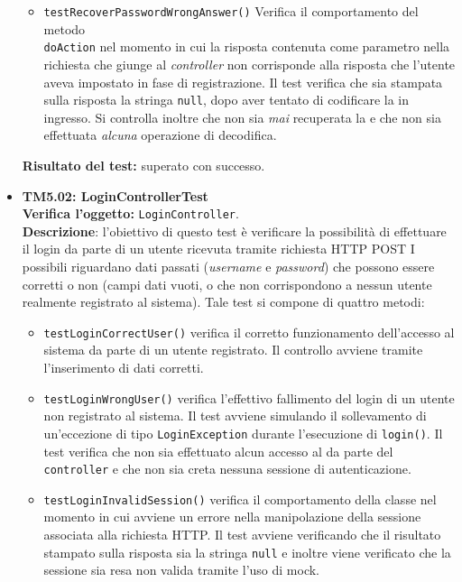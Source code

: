 \begin{itemize}
\begin{itemize}
\item \texttt{testRecoverPasswordWrongAnswer()} Verifica il comportamento del metodo \\ \texttt{doAction} nel momento in cui la risposta contenuta come parametro nella richiesta che giunge al \textit{controller} non corrisponde alla risposta che l'utente aveva impostato in fase di registrazione. Il test verifica che sia stampata sulla risposta la stringa \texttt{null}, dopo aver tentato di codificare la  in ingresso. Si controlla inoltre che non sia \textit{mai} recuperata la  e che non sia effettuata \textit{alcuna} operazione di decodifica.

\end{itemize}

\textbf{Risultato del test:} superato con successo.


\item \textbf{TM5.02: LoginControllerTest}\\
\textbf{Verifica l'oggetto:} \texttt{LoginController}.\\
\textbf{Descrizione}: l'obiettivo di questo test è verificare la possibilità di effettuare il login da parte di un utente ricevuta tramite richiesta HTTP POST I possibili  riguardano dati passati (\textit{username} e \textit{password}) che possono essere corretti o non (campi dati vuoti, o che non corrispondono a nessun utente realmente registrato al sistema).
Tale test si compone di quattro metodi:
\begin{itemize}

\item \texttt{testLoginCorrectUser()} verifica il corretto funzionamento dell'accesso al sistema da parte di un utente registrato. Il controllo avviene tramite l'inserimento di dati corretti.

\item \texttt{testLoginWrongUser()} verifica l'effettivo fallimento del login di un utente  non registrato al sistema. Il test avviene simulando il sollevamento di un'eccezione di tipo \texttt{LoginException} durante l'esecuzione di \texttt{login()}. Il test verifica che non sia effettuato alcun accesso al  da parte del \texttt{controller} e che non sia creta nessuna sessione di autenticazione.

\item \texttt{testLoginInvalidSession()} 
verifica il comportamento della classe nel momento in cui avviene un errore nella manipolazione della sessione associata alla richiesta HTTP. Il test avviene verificando che il risultato stampato sulla risposta sia la stringa \texttt{null} e inoltre viene verificato che la sessione sia resa non valida tramite l'uso di mock.


\end{itemize}
\end{itemize}
